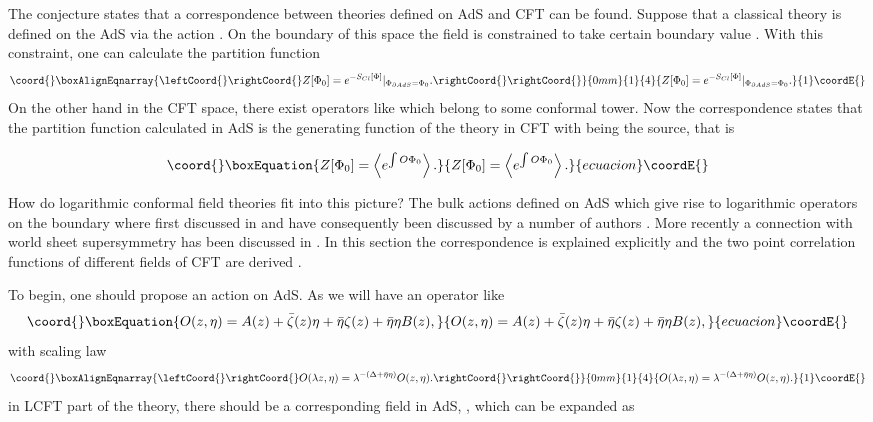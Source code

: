 \documentclass[a4paper,11pt]{article}
\begin{document}
The conjecture states that a correspondence between theories
defined on AdS\coordHE{} and CFT\coordHE{} can be found. Suppose that a
classical theory is defined on the AdS\coordHE{} via the action
\coordHE{}. On the boundary of this space the field is constrained
to take certain boundary value \coordHE{}.
With this constraint, one can calculate the partition function
\begin{eqnarray}\coord{}\boxAlignEqnarray{\leftCoord{}\rightCoord{}\label{eq:a112}
Z[\Phi_0]={e^{-S_{Cl}[\Phi]}}|_{\Phi_{\partial AdS}=\Phi_0}.\rightCoord{}
\rightCoord{}}{0mm}{1}{4}{Z[\Phi_0]={e^{-S_{Cl}[\Phi]}}|_{\Phi_{\partial AdS}=\Phi_0}.
}{1}\coordE{}\end{eqnarray}
On the other hand in the CFT\coordHE{} space, there exist operators
like \coordHE{} which belong to some conformal tower. Now the
correspondence states that the partition function calculated in
AdS is the generating function of the theory in CFT with \coordHE{}
being the source, that is

\begin{equation}\coord{}\boxEquation{\label{eq:a113}
Z[\Phi_0]=\left\langle e^{\int O\Phi_0} \right\rangle.
}{Z[\Phi_0]=\left\langle e^{\int O\Phi_0} \right\rangle.
}{ecuacion}\coordE{}\end{equation}

How do logarithmic conformal field theories fit into this
picture? The bulk actions defined on AdS\coordHE{} which give rise to
logarithmic operators on the boundary where first discussed in
\cite{khor,iko} and have consequently been discussed by a number
of authors \cite{lewis,myu}. More recently a connection with world
sheet supersymmetry has been discussed in \cite{pol}. In this
section the correspondence is explained explicitly and the two
point correlation functions of different fields of CFT are
derived \cite{rou}.

 To begin, one should propose an action on AdS. As we will have an
operator like
\begin{equation}\coord{}\boxEquation{ \label{eq:a115}
O(z,\eta)= A(z) +\bar{\zeta}(z) \eta +\bar{\eta} \zeta(z) +
\bar{\eta} \eta B(z),
}{ O(z,\eta)= A(z) +\bar{\zeta}(z) \eta +\bar{\eta} \zeta(z) +
\bar{\eta} \eta B(z),
}{ecuacion}\coordE{}\end{equation}
with scaling law
\begin{eqnarray}\coord{}\boxAlignEqnarray{\leftCoord{}\rightCoord{}\label{eq:a116}
O(\lambda z,\eta)=\lambda^{-(\Delta+\bar{\eta}\eta)} O(z,\eta) . \rightCoord{}
\rightCoord{}}{0mm}{1}{4}{O(\lambda z,\eta)=\lambda^{-(\Delta+\bar{\eta}\eta)} O(z,\eta) . 
}{1}\coordE{}\end{eqnarray}
in LCFT part of the theory, there should be a corresponding field
in AdS, \coordHE{}, which can be expanded as
\end{document}
